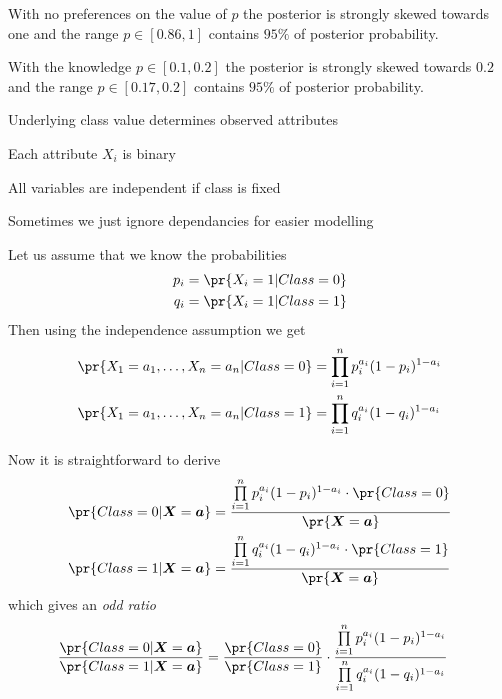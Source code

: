 \documentclass[landscape,footrule]{foils}
\begin{document}
\vspace*{-0.5cm}

With no preferences on the value of $p$ the posterior is strongly skewed towards one and the range $p\in[0.86,1]$
contains $95\%$ of posterior probability.


\vspace*{-0.5cm}

With the knowledge $p\in[0.1,0.2]$ the posterior is strongly skewed towards $0.2$ and the range $p\in[0.17,0.2]$
contains $95\%$ of posterior probability.





Underlying class value determines observed attributes 
\begin{triangles}
\item Each attribute $X_i$ is binary 
\item All variables are independent if class is fixed
\item Sometimes we just ignore dependancies for easier modelling
\end{triangles}


Let us assume that we know the probabilities
\begin{align*}
p_i&=\pr{X_i=1|Class=0}\\
q_i&=\pr{X_i=1|Class=1}
\end{align*}
Then using the independence assumption we get
\begin{align*}
\pr{X_1=a_1,\ldots,X_n=a_n|Class=0}&=\prod_{i=1}^np_i^{a_i}(1-p_i)^{1-a_i}\\
\pr{X_1=a_1,\ldots,X_n=a_n|Class=1}&=\prod_{i=1}^nq_i^{a_i}(1-q_i)^{1-a_i}
\end{align*}


\enlargethispage{1.5cm}
Now it is straightforward to derive
\begin{align*}
\pr{Class=0|\vec{X}=\vec{a}}&= \frac{\prod\limits_{i=1}^np_i^{a_i}(1-p_i)^{1-a_i}\cdot\pr{Class=0}}{\pr{\vec{X}=\vec{a}}}\\
\pr{Class=1|\vec{X}=\vec{a}}&= \frac{\prod\limits_{i=1}^nq_i^{a_i}(1-q_i)^{1-a_i}\cdot\pr{Class=1}}{\pr{\vec{X}=\vec{a}}}
\end{align*}
which gives an \emph{odd ratio} 
\begin{align*}
\frac{\pr{Class=0|\vec{X}=\vec{a}}}{\pr{Class=1|\vec{X}=\vec{a}}}&=\frac{\pr{Class=0}}{\pr{Class=1}}\cdot\frac{\prod\limits_{i=1}^np_i^{a_i}(1-p_i)^{1-a_i}}{\prod\limits_{i=1}^nq_i^{a_i}(1-q_i)^{1-a_i}}
\end{align*} 
 
\end{document}
